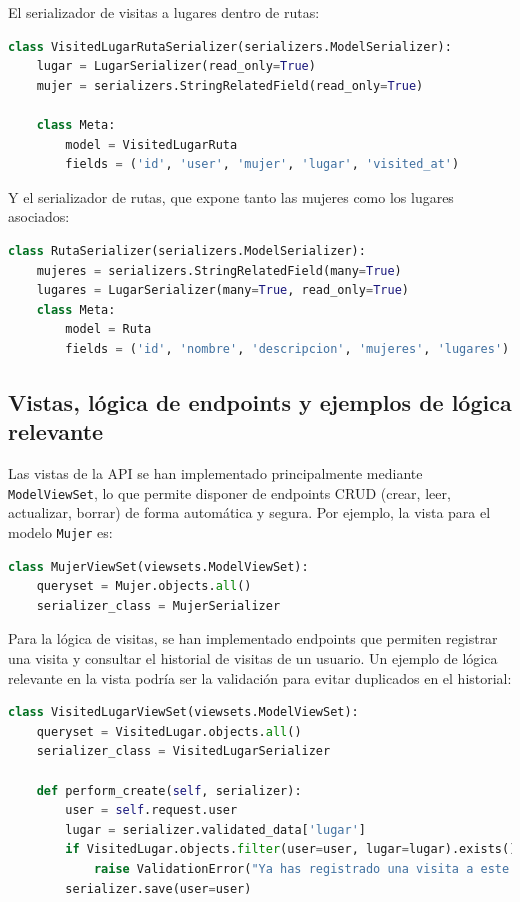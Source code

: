 El serializador de visitas a lugares dentro de rutas:

\begin{lstlisting}[language=Python, caption={Serializador VisitedLugarRuta}]
class VisitedLugarRutaSerializer(serializers.ModelSerializer):
    lugar = LugarSerializer(read_only=True)
    mujer = serializers.StringRelatedField(read_only=True)

    class Meta:
        model = VisitedLugarRuta
        fields = ('id', 'user', 'mujer', 'lugar', 'visited_at')
\end{lstlisting}

Y el serializador de rutas, que expone tanto las mujeres como los lugares asociados:

\begin{lstlisting}[language=Python, caption={Serializador Ruta}]
class RutaSerializer(serializers.ModelSerializer):
    mujeres = serializers.StringRelatedField(many=True)
    lugares = LugarSerializer(many=True, read_only=True)
    class Meta:
        model = Ruta
        fields = ('id', 'nombre', 'descripcion', 'mujeres', 'lugares')
\end{lstlisting}

\subsection{Vistas, lógica de endpoints y ejemplos de lógica relevante}

Las vistas de la API se han implementado principalmente mediante \texttt{ModelViewSet}, lo que permite disponer de endpoints CRUD (crear, leer, actualizar, borrar) de forma automática y segura. Por ejemplo, la vista para el modelo \texttt{Mujer} es:

\begin{lstlisting}[language=Python, caption={Vista MujerViewSet}]
class MujerViewSet(viewsets.ModelViewSet):
    queryset = Mujer.objects.all()
    serializer_class = MujerSerializer
\end{lstlisting}

Para la lógica de visitas, se han implementado endpoints que permiten registrar una visita y consultar el historial de visitas de un usuario. Un ejemplo de lógica relevante en la vista podría ser la validación para evitar duplicados en el historial:

\begin{lstlisting}[language=Python, caption={Lógica para evitar duplicados en visitas}]
class VisitedLugarViewSet(viewsets.ModelViewSet):
    queryset = VisitedLugar.objects.all()
    serializer_class = VisitedLugarSerializer

    def perform_create(self, serializer):
        user = self.request.user
        lugar = serializer.validated_data['lugar']
        if VisitedLugar.objects.filter(user=user, lugar=lugar).exists():
            raise ValidationError("Ya has registrado una visita a este lugar.")
        serializer.save(user=user)
\end{lstlisting}

